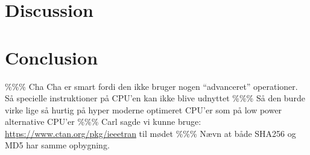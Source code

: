\documentclass[a4paper]{article}
\begin{document}
\section{Discussion}
\label{sec:org01896c8}

\section{Conclusion}
\label{sec:org3b3152a}




\begin{appendix}

\end{appendix}
\%\%\% Cha Cha er smart fordi den ikke bruger nogen ``advanceret'' operationer. Så specielle instruktioner på CPU'en kan ikke blive udnyttet
\%\%\% Så den burde virke lige så hurtig på hyper moderne optimeret CPU'er som på low power alternative CPU'er
\%\%\% Carl sagde vi kunne bruge: \url{https://www.ctan.org/pkg/ieeetran} til mødet
\%\%\% Nævn at både SHA256 og MD5 har samme opbygning.
\end{document}
